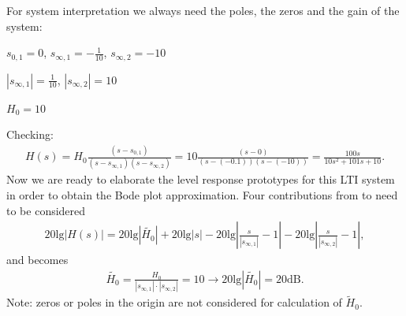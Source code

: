 \begin{ExCalc}
For system interpretation we always need the poles, the zeros and the gain of
the system:

$s_{0,1}=0$,
$s_{\infty,1}=-\frac{1}{10}$,
$s_{\infty,2}=-10$

$|s_{\infty,1}|=\frac{1}{10}$,
$|s_{\infty,2}|=10$

$H_0=10$

\begin{center}
\end{center}

Checking:
\begin{align}
H(s) = H_0\frac{(s-s_{0,1})}{(s-s_{\infty,1})(s-s_{\infty,2})} = 10\frac{(s-0)}{(s-(-0.1))(s-(-10))}
=\frac{100 s}{10 s^2 + 101 s + 10}.
\end{align}
%
Now we are ready to elaborate the level response prototypes for this
LTI system in order to obtain the Bode plot approximation.
%
Four contributions from  to  need to be considered
\begin{align}
20\mathrm{lg}|H(s)| = 20\mathrm{lg}|\tilde{H_0}| + 20\mathrm{lg}|s| - 20\mathrm{lg}|\frac{s}{|s_{\infty,1}|}-1|
- 20\mathrm{lg}|\frac{s}{|s_{\infty,2}|}-1|,
\end{align}
and  becomes
\begin{align}
\tilde{H_0} = \frac{H_0}{|s_{\infty,1}| \cdot |s_{\infty,2}|} = 10 \rightarrow 20\mathrm{lg}|\tilde{H_0}| = 20 \mathrm{dB}.
\end{align}
Note: zeros or poles in the origin are not considered for calculation of $\tilde{H}_0$.
\end{ExCalc}
